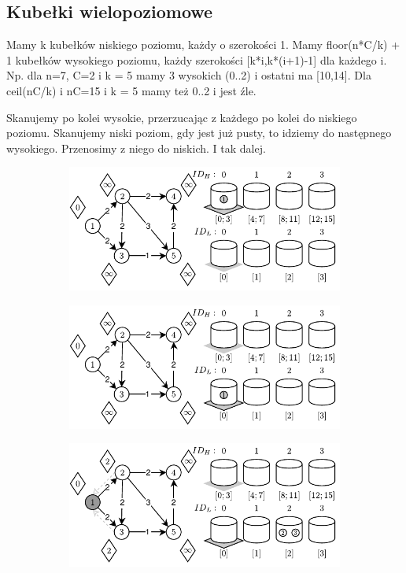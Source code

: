 \subsection{Kubełki wielopoziomowe}

Mamy k kubełków niskiego poziomu, każdy o szerokości 1. Mamy floor(n*C/k) + 1 kubełków wysokiego poziomu, każdy szerokości [k*i,k*(i+1)-1] dla każdego i. Np. dla n=7, C=2 i k = 5 mamy 3 wysokich (0..2) i ostatni ma [10,14]. Dla ceil(nC/k) i nC=15 i k = 5 mamy też 0..2 i jest źle.

Skanujemy po kolei wysokie, przerzucając z każdego po kolei do niskiego poziomu. Skanujemy niski poziom, gdy jest już pusty, to idziemy do następnego wysokiego. Przenosimy z niego do niskich. I tak dalej.

\begin{figure}[!htbp]
	\centering
	\begin{subfigure}[b]{0.45\textwidth}
		\includegraphics[width=\textwidth]{Chapter_II/4/a.pdf}
		\caption{}
	\end{subfigure}%
	\qquad
	\begin{subfigure}[b]{0.45\textwidth}
		\includegraphics[width=\textwidth]{Chapter_II/4/b.pdf}
		\caption{}
	\end{subfigure}
	\begin{subfigure}[b]{0.45\textwidth}
		\includegraphics[width=\textwidth]{Chapter_II/4/c.pdf}

\end{subfigure}
\end{figure}
